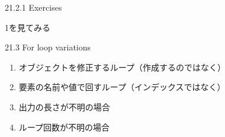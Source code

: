 \documentclass[ignorenonframetext,]{beamer}
\providecommand{\tightlist}{%
  \setlength{\itemsep}{0pt}\setlength{\parskip}{0pt}}
\begin{document}
\begin{frame}{21.2.1 Exercises}

1を見てみる

\end{frame}

\begin{frame}{21.3 For loop variations}

\begin{enumerate}
\def\labelenumi{\arabic{enumi}.}
\tightlist
\item
  オブジェクトを修正するループ（作成するのではなく）
\item
  要素の名前や値で回すループ（インデックスではなく）
\item
  出力の長さが不明の場合
\item
  ループ回数が不明の場合
\end{enumerate}

\end{frame}
\end{document}

